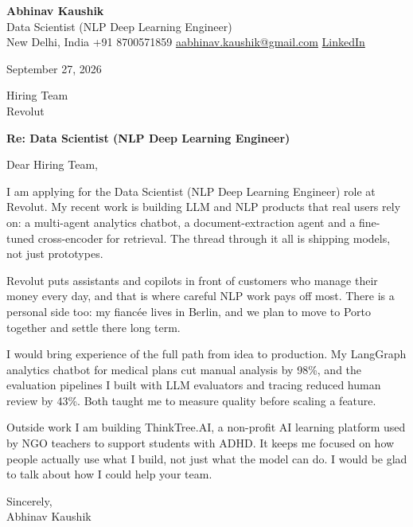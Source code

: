 \documentclass[11pt,a4paper]{article}
\begin{document}
{\Large\bfseries Abhinav Kaushik}\\
Data Scientist (NLP Deep Learning Engineer)\\
New Delhi, India \textbar{} +91 8700571859 \textbar{} \href{mailto:aabhinav.kaushik@gmail.com}{aabhinav.kaushik@gmail.com} \textbar{} \href{https://www.linkedin.com/in/abhinav-kaushik10/}{LinkedIn}  

September 27, 2026

Hiring Team\\
Revolut

\textbf{Re: Data Scientist (NLP Deep Learning Engineer)}

Dear Hiring Team,

I am applying for the Data Scientist (NLP Deep Learning Engineer) role at Revolut. My recent work is building LLM and NLP products that real users rely on: a multi-agent analytics chatbot, a document-extraction agent and a fine-tuned cross-encoder for retrieval. The thread through it all is shipping models, not just prototypes.

Revolut puts assistants and copilots in front of customers who manage their money every day, and that is where careful NLP work pays off most. There is a personal side too: my fiancée lives in Berlin, and we plan to move to Porto together and settle there long term.

I would bring experience of the full path from idea to production. My LangGraph analytics chatbot for medical plans cut manual analysis by 98\%, and the evaluation pipelines I built with LLM evaluators and tracing reduced human review by 43\%. Both taught me to measure quality before scaling a feature.

Outside work I am building ThinkTree.AI, a non-profit AI learning platform used by NGO teachers to support students with ADHD. It keeps me focused on how people actually use what I build, not just what the model can do. I would be glad to talk about how I could help your team.

Sincerely,\\[4pt]
Abhinav Kaushik
\end{document}
